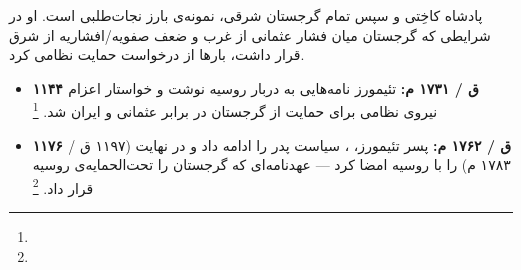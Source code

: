 \begin{tcolorbox}[casebox, title={نمونه‌ی تاریخی: پادشاه تئیمورز دوم و دعوت از روسیه}]
 پادشاه کاخِتی و سپس تمام گرجستان شرقی، نمونه‌ی بارز نجات‌طلبی است. او در شرایطی که گرجستان میان فشار عثمانی از غرب و ضعف صفویه/افشاریه از شرق قرار داشت، بارها از  درخواست حمایت نظامی کرد.

\begin{itemize}[nosep, rightmargin=1em]
  \item \textbf{۱۱۴۴ ق / ۱۷۳۱ م:} تئیمورز نامه‌هایی به دربار روسیه نوشت و خواستار اعزام نیروی نظامی برای حمایت از گرجستان در برابر عثمانی و ایران شد.%
  \footnote{}
  \item \textbf{۱۱۷۶ ق / ۱۷۶۲ م:} پسر تئیمورز، ، سیاست پدر را ادامه داد و در نهایت  (۱۱۹۷ ق / ۱۷۸۳ م) را با روسیه امضا کرد — عهدنامه‌ای که گرجستان را تحت‌الحمایه‌ی روسیه قرار داد.%
  \footnote{}
\end{itemize}
\end{tcolorbox}

